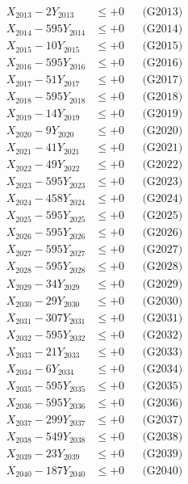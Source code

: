 \documentclass[a4paper,10pt]{article}
\begin{document}
{\begin{align}
X_{2013} - 2Y_{2013} &\leq +0 && \text{(G2013)} \\
X_{2014} - 595Y_{2014} &\leq +0 && \text{(G2014)} \\
X_{2015} - 10Y_{2015} &\leq +0 && \text{(G2015)} \\
X_{2016} - 595Y_{2016} &\leq +0 && \text{(G2016)} \\
X_{2017} - 51Y_{2017} &\leq +0 && \text{(G2017)} \\
X_{2018} - 595Y_{2018} &\leq +0 && \text{(G2018)} \\
X_{2019} - 14Y_{2019} &\leq +0 && \text{(G2019)} \\
X_{2020} - 9Y_{2020} &\leq +0 && \text{(G2020)} \\
\allowbreak
X_{2021} - 41Y_{2021} &\leq +0 && \text{(G2021)} \\
X_{2022} - 49Y_{2022} &\leq +0 && \text{(G2022)} \\
X_{2023} - 595Y_{2023} &\leq +0 && \text{(G2023)} \\
X_{2024} - 458Y_{2024} &\leq +0 && \text{(G2024)} \\
X_{2025} - 595Y_{2025} &\leq +0 && \text{(G2025)} \\
X_{2026} - 595Y_{2026} &\leq +0 && \text{(G2026)} \\
X_{2027} - 595Y_{2027} &\leq +0 && \text{(G2027)} \\
X_{2028} - 595Y_{2028} &\leq +0 && \text{(G2028)} \\
X_{2029} - 34Y_{2029} &\leq +0 && \text{(G2029)} \\
X_{2030} - 29Y_{2030} &\leq +0 && \text{(G2030)} \\
\allowbreak
X_{2031} - 307Y_{2031} &\leq +0 && \text{(G2031)} \\
X_{2032} - 595Y_{2032} &\leq +0 && \text{(G2032)} \\
X_{2033} - 21Y_{2033} &\leq +0 && \text{(G2033)} \\
X_{2034} - 6Y_{2034} &\leq +0 && \text{(G2034)} \\
X_{2035} - 595Y_{2035} &\leq +0 && \text{(G2035)} \\
X_{2036} - 595Y_{2036} &\leq +0 && \text{(G2036)} \\
X_{2037} - 299Y_{2037} &\leq +0 && \text{(G2037)} \\
X_{2038} - 549Y_{2038} &\leq +0 && \text{(G2038)} \\
X_{2039} - 23Y_{2039} &\leq +0 && \text{(G2039)} \\
X_{2040} - 187Y_{2040} &\leq +0 && \text{(G2040)} \\

\end{align}}
\end{document}
